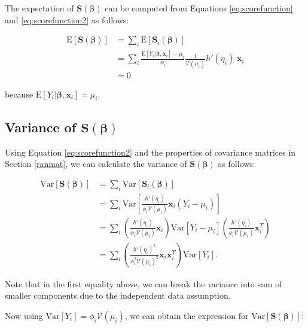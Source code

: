 \documentclass[
  12pt,
]{book}
\begin{document}
The expectation of \(\boldsymbol{S}(\boldsymbol{\beta})\) can be computed from Equations \eqref{eq:scorefunction} and \eqref{eq:scorefunction2} as follows:

\begin{align}
  {\mathrm E}[\boldsymbol{S}(\boldsymbol{\beta})]
  & = \sum_{i} {\mathrm E}[\boldsymbol{S}_{i}(\boldsymbol{\beta})] \\
  & = \sum_{i} \frac{{\mathrm E}[Y_{i} |\boldsymbol{\beta}, \boldsymbol{x}_{i}] - \mu_{i}}{ \phi_{i}} \frac{1}{\mathcal{V}(\mu_{i})} h'(\eta_{i})\;\boldsymbol{x}_i \\
  & = 0
  \label{eq:expectationSbeta}
\end{align}

because \({\mathrm E}[Y_{i} |\boldsymbol{\beta}, \boldsymbol{x}_{i}] = \mu_{i}\).

\subsection{\texorpdfstring{Variance of \(\boldsymbol{S}(\boldsymbol{\beta})\)}{Variance of \textbackslash boldsymbol\{S\}(\textbackslash boldsymbol\{\textbackslash beta\})}}\label{variance-of-boldsymbolsboldsymbolbeta}

Using Equation \eqref{eq:scorefunction2} and the properties of covariance matrices in Section \ref{ranmat}, we can calculate the variance of \(\boldsymbol{S}(\boldsymbol{\beta})\) as follows:

\begin{align}
  {\mathrm{Var}}[\boldsymbol{S}(\boldsymbol{\beta})]
  & = \sum_{i} {\mathrm{Var}}[\boldsymbol{S}_{i}(\boldsymbol{\beta})] \\
  & = \sum_{i} \mathrm{Var} \left[ \frac{h'(\eta_{i})}{\phi_i \mathcal{V}(\mu_{i})} \boldsymbol{x}_{i} (Y_{i} - \mu_{i}) \right] \\
  & = \sum_{i} \left( \frac{h'(\eta_{i})}{\phi_i \mathcal{V}(\mu_{i})} \boldsymbol{x}_{i} \right) {\mathrm{Var}}[Y_{i} - \mu_{i}] \left( \frac{h'(\eta_{i})}{\phi_i \mathcal{V}(\mu_{i})} \boldsymbol{x}_{i}^T \right) \\
  &= \sum_{i} \left( \frac{h'(\eta_{i})^2}{\phi_i^2 \mathcal{V}(\mu_{i})^2} \boldsymbol{x}_{i} \boldsymbol{x}_{i}^T \right) {\mathrm{Var}}[Y_{i}].
\end{align}

Note that in the first equality above, we can break the variance into sum of smaller components due to the independent data assumption.

Now using \({\mathrm{Var}}[Y_i] = \phi_i \mathcal{V}(\mu_{i})\), we can obtain the expression for \({\mathrm{Var}}[\boldsymbol{S}(\boldsymbol{\beta})]\):
\end{document}
